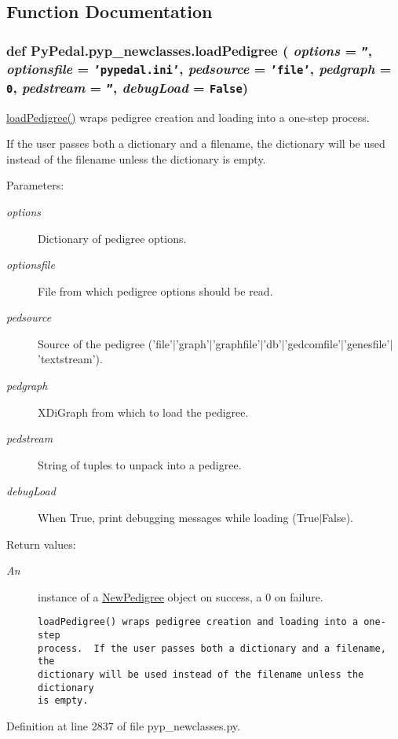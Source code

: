 \subsection{Function Documentation}
\hypertarget{namespacePyPedal_1_1pyp__newclasses_35a47ad1c56cecbe403dfa79c4bacb35}{
\subsubsection[loadPedigree]{\setlength{\rightskip}{0pt plus 5cm}def Py\-Pedal.pyp\_\-newclasses.load\-Pedigree ( {\em options} = {\tt ''},  {\em optionsfile} = {\tt 'pypedal.ini'},  {\em pedsource} = {\tt 'file'},  {\em pedgraph} = {\tt 0},  {\em pedstream} = {\tt ''},  {\em debug\-Load} = {\tt False})}}
\label{namespacePyPedal_1_1pyp__newclasses_35a47ad1c56cecbe403dfa79c4bacb35}


\hyperlink{namespacePyPedal_1_1pyp__newclasses_35a47ad1c56cecbe403dfa79c4bacb35}{load\-Pedigree()} wraps pedigree creation and loading into a one-step process. 

If the user passes both a dictionary and a filename, the dictionary will be used instead of the filename unless the dictionary is empty. \begin{Desc}
\item[Parameters:]
\begin{description}
\item[{\em options}]Dictionary of pedigree options. \item[{\em optionsfile}]File from which pedigree options should be read. \item[{\em pedsource}]Source of the pedigree ('file'$|$'graph'$|$'graphfile'$|$'db'$|$'gedcomfile'$|$'genesfile'$|$'textstream'). \item[{\em pedgraph}]XDi\-Graph from which to load the pedigree. \item[{\em pedstream}]String of tuples to unpack into a pedigree. \item[{\em debug\-Load}]When True, print debugging messages while loading (True$|$False). \end{description}
\end{Desc}
\begin{Desc}
\item[Return values:]
\begin{description}
\item[{\em An}]instance of a \hyperlink{classPyPedal_1_1pyp__newclasses_1_1NewPedigree}{New\-Pedigree} object on success, a 0 on failure.

\footnotesize\begin{verbatim}loadPedigree() wraps pedigree creation and loading into a one-step
process.  If the user passes both a dictionary and a filename, the
dictionary will be used instead of the filename unless the dictionary
is empty.
\end{verbatim}
\normalsize
 \end{description}
\end{Desc}


Definition at line 2837 of file pyp\_\-newclasses.py.